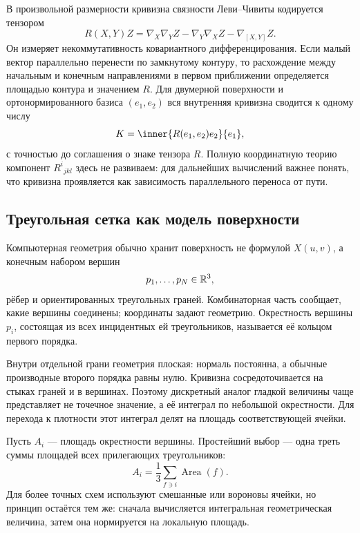 В произвольной размерности кривизна связности Леви--Чивиты кодируется тензором
\begin{equation}
\label{eq:riemann-curvature-tensor}
R(X,Y)Z
=
\nabla_X\nabla_YZ
-\nabla_Y\nabla_XZ
-\nabla_{[X,Y]}Z.
\end{equation}
Он измеряет некоммутативность ковариантного дифференцирования. Если малый вектор параллельно перенести по замкнутому контуру, то расхождение между начальным и конечным направлениями в первом приближении определяется площадью контура и значением \(R\). Для двумерной поверхности и ортонормированного базиса \((e_1,e_2)\) вся внутренняя кривизна сводится к одному числу
\begin{equation}
\label{eq:gaussian-from-riemann}
K=\inner{R(e_1,e_2)e_2}{e_1},
\end{equation}
с точностью до соглашения о знаке тензора \(R\). Полную координатную теорию компонент \(R^i{}_{jkl}\) здесь не развиваем: для дальнейших вычислений важнее понять, что кривизна проявляется как зависимость параллельного переноса от пути.

\subsection{Треугольная сетка как модель поверхности}

Компьютерная геометрия обычно хранит поверхность не формулой \(X(u,v)\), а конечным набором вершин
\[
p_1,\ldots,p_N\in\mathbb{R}^3,
\]
рёбер и ориентированных треугольных граней. Комбинаторная часть сообщает, какие вершины соединены; координаты задают геометрию. Окрестность вершины \(p_i\), состоящая из всех инцидентных ей треугольников, называется её кольцом первого порядка.

Внутри отдельной грани геометрия плоская: нормаль постоянна, а обычные производные второго порядка равны нулю. Кривизна сосредоточивается на стыках граней и в вершинах. Поэтому дискретный аналог гладкой величины чаще представляет не точечное значение, а её интеграл по небольшой окрестности. Для перехода к плотности этот интеграл делят на площадь соответствующей ячейки.

Пусть \(A_i\) --- площадь окрестности вершины. Простейший выбор --- одна треть суммы площадей всех прилегающих треугольников:
\begin{equation}
\label{eq:barycentric-vertex-area}
A_i=\frac13\sum_{f\ni i}\operatorname{Area}(f).
\end{equation}
Для более точных схем используют смешанные или вороновы ячейки, но принцип остаётся тем же: сначала вычисляется интегральная геометрическая величина, затем она нормируется на локальную площадь.


